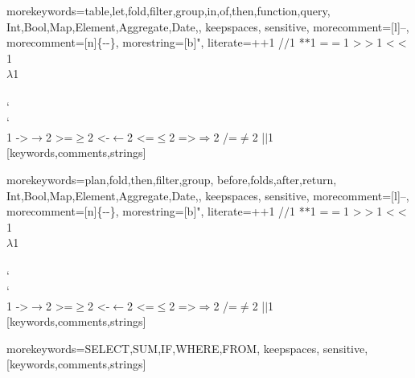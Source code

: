 
%
  {morekeywords={table,let,fold,filter,group,in,of,then,function,query,%
                Int,Bool,Map,Element,Aggregate,Date,},%
   keepspaces,%
   sensitive,%
   morecomment=[l]--,%
   morecomment=[n]{\{-}{-\}},%
   morestring=[b]",%
   literate={+}{{$+$}}1 {/}{{$/$}}1 {*}{{$*$}}1 {=}{{$=$}}1
            {>}{{$>$}}1 {<}{{$<$}}1 {\\}{{$\lambda$}}1
            {\\\\}{{\char`\\\char`\\}}1
            {->}{{$\rightarrow$}}2 {>=}{{$\geq$}}2 {<-}{{$\leftarrow$}}2
            {<=}{{$\leq$}}2 {=>}{{$\Rightarrow$}}2 
            {/=}{{$\ne$}}2
            {|}{{$\mid$}}1
  }[keywords,comments,strings]%

%
  {morekeywords={plan,fold,then,filter,group,%
                before,folds,after,return,%
                Int,Bool,Map,Element,Aggregate,Date,},%
   keepspaces,%
   sensitive,%
   morecomment=[l]--,%
   morecomment=[n]{\{-}{-\}},%
   morestring=[b]",%
   literate={+}{{$+$}}1 {/}{{$/$}}1 {*}{{$*$}}1 {=}{{$=$}}1
            {>}{{$>$}}1 {<}{{$<$}}1 {\\}{{$\lambda$}}1
            {\\\\}{{\char`\\\char`\\}}1
            {->}{{$\rightarrow$}}2 {>=}{{$\geq$}}2 {<-}{{$\leftarrow$}}2
            {<=}{{$\leq$}}2 {=>}{{$\Rightarrow$}}2 
            {/=}{{$\ne$}}2
            {|}{{$\mid$}}1
  }[keywords,comments,strings]%

%
  {morekeywords={SELECT,SUM,IF,WHERE,FROM},%
   keepspaces,%
   sensitive,%
  }[keywords,comments,strings]%




